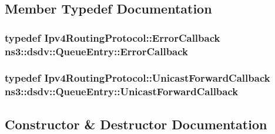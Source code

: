 \subsection{Member Typedef Documentation}
\subsubsection[{\texorpdfstring{Error\+Callback}{ErrorCallback}}]{\setlength{\rightskip}{0pt plus 5cm}typedef {\bf Ipv4\+Routing\+Protocol\+::\+Error\+Callback} {\bf ns3\+::dsdv\+::\+Queue\+Entry\+::\+Error\+Callback}}\hypertarget{classns3_1_1dsdv_1_1QueueEntry_ad6d86a09705f644d2535f606e70c1c29}{}\label{classns3_1_1dsdv_1_1QueueEntry_ad6d86a09705f644d2535f606e70c1c29}
\subsubsection[{\texorpdfstring{Unicast\+Forward\+Callback}{UnicastForwardCallback}}]{\setlength{\rightskip}{0pt plus 5cm}typedef {\bf Ipv4\+Routing\+Protocol\+::\+Unicast\+Forward\+Callback} {\bf ns3\+::dsdv\+::\+Queue\+Entry\+::\+Unicast\+Forward\+Callback}}\hypertarget{classns3_1_1dsdv_1_1QueueEntry_a5c41d545aa1e05b73ee36b718f331522}{}\label{classns3_1_1dsdv_1_1QueueEntry_a5c41d545aa1e05b73ee36b718f331522}


\subsection{Constructor \& Destructor Documentation}
